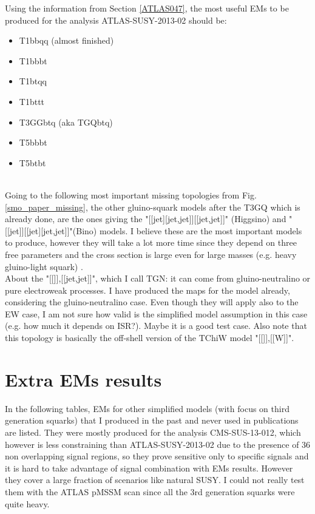 \documentclass[a4paper,11pt]{article}
\begin{document}
Using the information from Section \ref{ATLAS047}, the most useful EMs to be produced for the analysis ATLAS-SUSY-2013-02 should be:
\begin{itemize}
	\item T1bbqq (almost finished) \
	\item T1bbbt \
	\item T1btqq \
	\item T1bttt \
	\item T3GGbtq (aka TGQbtq) \
	\item T5bbbt \
	\item T5btbt \
\end{itemize}
\\

Going to the following most important missing topologies from Fig. \ref{smo_paper_missing}, the other gluino-squark models after the T3GQ which is already done, are the ones giving the "[[jet][jet,jet]][[jet,jet]]" (Higgsino) and "[[jet]][[jet][jet,jet]]"(Bino) models. I believe these are the most important models to produce, however they will take a lot more time since they depend on three free parameters and the cross section is large even for large masses (e.g. heavy gluino-light squark) .
\\

About the "[[]],[[jet,jet]]", which I call TGN: it can come from gluino-neutralino or pure electroweak processes. I have produced the maps for the model already, considering the gluino-neutralino case. Even though they will apply also to the EW case, I am not sure how valid is the simplified model assumption in this case (e.g. how much it depends on ISR?). Maybe it is a good test case.
Also note that this topology is basically the off-shell version of the TChiW model "[[]],[[W]]". 
%
\section{Extra EMs results}
In the following tables, EMs for other simplified models (with focus on third generation squarks) that I produced in the past and never used in publications are listed. They were mostly produced for the analysis CMS-SUS-13-012, which however is less constraining than ATLAS-SUSY-2013-02 due to the presence of 36 non overlapping signal regions, so they prove sensitive only to specific signals and it is hard to take advantage of signal combination with EMs results. However they cover a large fraction of scenarios like natural SUSY. I could not really test them with the ATLAS pMSSM scan since all the 3rd generation squarks were quite heavy.
\\
\end{document}
